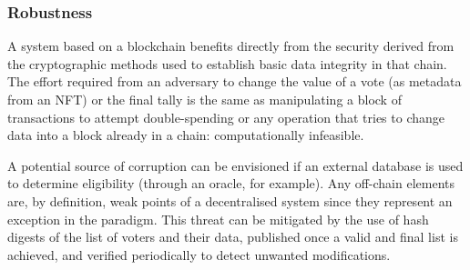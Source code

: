 \documentclass[../main.tex]{subfiles}
\begin{document}
        \subsubsection{Robustness}
        \label{robustness}
            A system based on a blockchain benefits directly from the security derived from the cryptographic methods used to establish basic data integrity in that chain. The effort required from an adversary to change the value of a vote (as metadata from an NFT) or the final tally is the same as manipulating a block of transactions to attempt double-spending or any operation that tries to change data into a block already in a chain: computationally infeasible.
            \par
            A potential source of corruption can be envisioned if an external database is used to determine eligibility (through an oracle, for example). Any off-chain elements are, by definition, weak points of a decentralised system since they represent an exception in the paradigm. This threat can be mitigated by the use of hash digests of the list of voters and their data, published once a valid and final list is achieved, and verified periodically to detect unwanted modifications.
\end{document}
